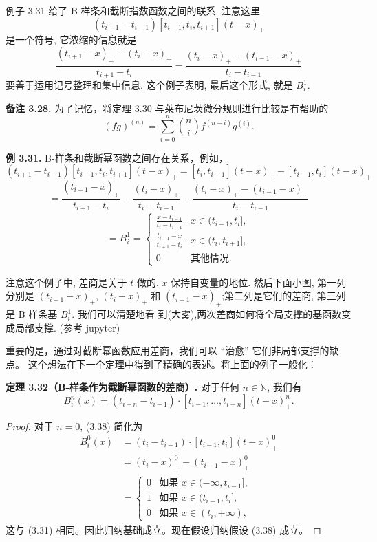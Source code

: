 \documentclass[a4paper]{ctexart}
\begin{document}
{例子 3.31 给了 B 样条和截断指数函数之间的联系. 注意这里
$$
(t_{i + 1} - t_{i - 1})[t_{i - 1}, t_i, t_{i + 1}](t - x)_+
$$
是一个符号, 它浓缩的信息就是
$$
\frac{(t_{i + 1} - x)_+ - (t_i - x)_+}{t_{i + 1} - t_i} 
- \frac{(t_i - x)_+ - (t_{i - 1} - x)_+}{t_i - t_{i - 1}}
$$
要善于运用记号整理和集中信息. 这个例子表明, 最后这个形式, 就是 $B_i^1$. 

\noindent \textbf{备注 3.28.} 为了记忆，将定理 3.30 与莱布尼茨微分规则进行比较是有帮助的
\[
(fg)^{(n)} = \sum_{i=0}^{n} \binom{n}{i} f^{(n-i)} g^{(i)}.
\]

\noindent \textbf{例 3.31.} B-样条和截断幂函数之间存在关系，例如，
\[
(t_{i+1} - t_{i-1})[t_{i-1}, t_i, t_{i+1}](t - x)_+ = [t_i, t_{i+1}](t - x)_+ - [t_{i-1}, t_i](t - x)_+
\]
\[
= \frac{(t_{i+1} - x)_+}{t_{i+1} - t_i} - \frac{(t_i - x)_+}{t_i - t_{i-1}} - \frac{(t_i - x)_+ - (t_{i-1} - x)_+}{t_i - t_{i-1}}
\]
\[
= B_i^1 = 
\begin{cases} 
\frac{x - t_{i-1}}{t_i - t_{i-1}} & x \in (t_{i-1}, t_i], \\
\frac{t_{i+1} - x}{t_{i+1} - t_i} & x \in (t_i, t_{i+1}], \\
0 & \text{其他情况}.
\end{cases}
\]

注意这个例子中, 差商是关于 $t$ 做的, $x$ 保持自变量的地位. 然后下面小图, 
第一列分别是 $(t_{i - 1} - x)_+$, $(t_i - x)_+$ 和 $(t_{i + 1} -
x)_+$;第二列是它们的差商, 第三列是 B 样条基 $B_i^1$. 我们可以清楚地看
到(大雾),两次差商如何将全局支撑的基函数变成局部支撑. (参考 jupyter)

重要的是，通过对截断幂函数应用差商，我们可以 ``治愈'' 它们非局部支撑的缺点。
这个想法在下一个定理中得到了精确的表述。将上面的例子一般化：

\noindent \textbf{定理 3.32（B-样条作为截断幂函数的差商）.} 对于任何 $n \in \mathbb{N}$, 我们有
\[
  B_i^n(x) = (t_{i+n} - t_{i-1}) \cdot [t_{i-1}, \ldots, t_{i+n}](t-x)_+^n.
\tag{3.38}
\]

\begin{proof}
对于 $n = 0$, (3.38) 简化为
  \begin{align*}
  B_i^0(x) &= (t_i - t_{i-1}) \cdot [t_{i-1}, t_i](t-x)_+^0 \\
  &= (t_i - x)_+^0 - (t_{i-1} - x)_+^0 \\
  &=
  \begin{cases}
  0 & \text{如果 } x \in (-\infty, t_{i-1}], \\
  1 & \text{如果 } x \in (t_{i-1}, t_i], \\
  0 & \text{如果 } x \in (t_i, +\infty),
  \end{cases}
  \end{align*}
这与 (3.31) 相同。因此归纳基础成立。现在假设归纳假设 (3.38) 成立。
  

\end{proof}}
\end{document}

